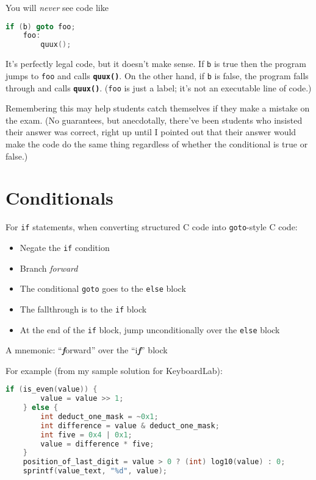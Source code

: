 \documentclass{article}
\newcommand{\function}[1]{\textbf{\lstinline{#1}}}
\begin{document}
You will \textit{never} see code like

\begin{lstlisting}[language=C]
        if (b) goto foo;
    foo:
        quux();
\end{lstlisting}

It's perfectly legal code, but it doesn't make sense.
If \lstinline{b} is true then the program jumps to \lstinline{foo} and calls \function{quux()}.
On the other hand, if \lstinline{b} is false, the program falls through and calls \function{quux()}.
(\lstinline{foo} is just a label; it's not an executable line of code.)

Remembering this may help students catch themselves if they make a mistake on the exam.
(No guarantees, but anecdotally, there've been students who insisted their answer was correct, right up until I pointed out that their answer would make the code do the same thing regardless of whether the conditional is true or false.)

\section{Conditionals}

For \lstinline{if} statements, when converting structured C code into \lstinline{goto}-style C code:
\begin{itemize}
    \item Negate the \lstinline{if} condition
    \item Branch \textit{forward}
    \item The conditional \lstinline{goto} goes to the \lstinline{else} block
    \item The fallthrough is to the \lstinline{if} block
    \item At the end of the \lstinline{if} block, jump unconditionally over the \lstinline{else} block
\end{itemize}
A mnemonic: ``\textbf{\textit{f}}orward'' over the ``i\textbf{\textit{f}}'' block

For example (from my sample solution for KeyboardLab):

\begin{lstlisting}[language=C]
    if (is_even(value)) {
        value = value >> 1;
    } else {
        int deduct_one_mask = ~0x1;
        int difference = value & deduct_one_mask;
        int five = 0x4 | 0x1;
        value = difference * five;
    }
    position_of_last_digit = value > 0 ? (int) log10(value) : 0;
    sprintf(value_text, "%d", value);
\end{lstlisting}
\end{document}
